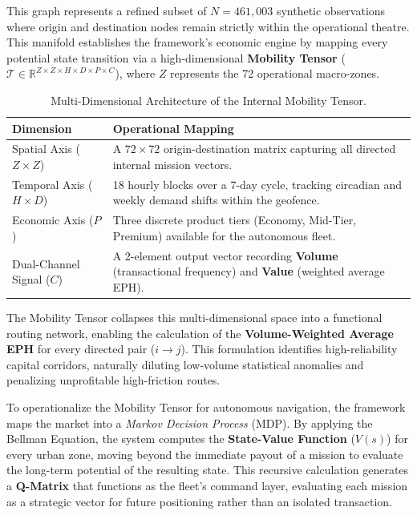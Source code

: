 \documentclass[10pt, letterpaper]{article}
\begin{document}
This graph represents a refined subset of $N = 461,003$ synthetic observations where origin and destination nodes remain strictly within the operational theatre. This manifold establishes the framework's economic engine by mapping every potential state transition via a high-dimensional \textbf{Mobility Tensor} ($\mathcal{T} \in \mathbb{R}^{Z \times Z \times H \times D \times P \times C}$), where $Z$ represents the 72 operational macro-zones. 

\begin{table}[H]
    \centering
    \small
    \begin{tabularx}{\textwidth}{l X}
        \toprule
        \textbf{Dimension} & \textbf{Operational Mapping} \\
        \midrule
        Spatial Axis ($Z \times Z$) & A $72 \times 72$ origin-destination matrix capturing all directed internal mission vectors. \\
        \addlinespace
        Temporal Axis ($H \times D$) & 18 hourly blocks over a 7-day cycle, tracking circadian and weekly demand shifts within the geofence. \\
        \addlinespace
        Economic Axis ($P$) & Three discrete product tiers (Economy, Mid-Tier, Premium) available for the autonomous fleet. \\
        \addlinespace
        Dual-Channel Signal ($C$) & A 2-element output vector recording \textbf{Volume} (transactional frequency) and \textbf{Value} (weighted average EPH). \\
        \bottomrule
    \end{tabularx}
    \caption{Multi-Dimensional Architecture of the Internal Mobility Tensor.}
    \label{tab:tensor_axes}
\end{table}

The Mobility Tensor collapses this multi-dimensional space into a functional routing network, enabling the calculation of the \textbf{Volume-Weighted Average EPH} for every directed pair ($i \to j$). This formulation identifies high-reliability capital corridors, naturally diluting low-volume statistical anomalies and penalizing unprofitable high-friction routes.


To operationalize the Mobility Tensor for autonomous navigation, the framework maps the market into a \textit{Markov Decision Process} (MDP). By applying the Bellman Equation, the system computes the \textbf{State-Value Function} ($V(s)$) for every urban zone, moving beyond the immediate payout of a mission to evaluate the long-term potential of the resulting state. This recursive calculation generates a \textbf{Q-Matrix} that functions as the fleet's command layer, evaluating each mission as a strategic vector for future positioning rather than an isolated transaction.
\end{document}
